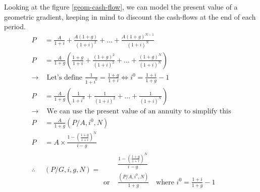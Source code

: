 \begin{definition}
    Looking at the figure \ref{geom-cash-flow}, we can model the present value of a geometric gradient, keeping in mind to discount the cash-flows at the end of each period.
    \begin{align*}
        P           & = \frac{A}{1 + i} + \frac{A(1+g)}{(1+i)^2} + \ldots + \frac{A(1+g)^{N-1}}{(1+i)^N}                                   \\
        P           & = \frac{A}{1 + g}\left(
        \frac{1 + g}{1 + i} + \frac{(1 + g)^2}{(1 + i)^2} + \ldots + \frac{(1 + g)^{N}}{(1 + i)^{N}}
        \right)                                                                                                                            \\
        \rightarrow & \text{ Let's define } \frac{1}{1 + i^0} = \frac{1+g}{1+i} \iff i^0 = \frac{1 + i}{1 + g} -1                          \\
        P           & = \frac{A}{1 + g} ( \frac{1}{1 + i^0} + \frac{1}{(1 + i)^2} + \ldots + \frac{1}{(1 + i)^N})                          \\
        \rightarrow & \text{ We can use the present value of an annuity to simplify this}                                                  \\
        P           & = \frac{A}{1 + g} (P/A, i^0, N)                                                                                      \\
        P           & = A \times \frac{1 - (\frac{1 + g}{1 + i})^N}{i - g}                                                                 \\
        \therefore  & \boxed{(P/G, i, g, N) =\begin{aligned}
                                                                & \frac{1 - (\frac{1 + g}{1 + i})^N}{i - g}                                     \\
                                                     \text{or } & \frac{(P/A, i^0, N)}{1 + g} \quad \text{where } i^0 = \frac{1 + i}{1 + g} - 1
                                                 \end{aligned}}
    \end{align*}
\end{definition}

